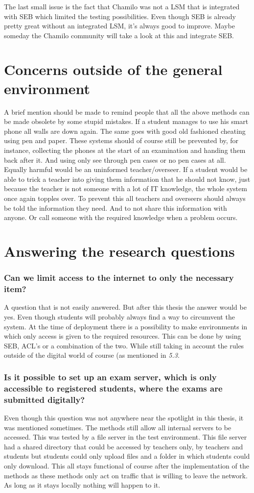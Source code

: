 The last small issue is the fact that Chamilo was not a LSM that is integrated with SEB which limited the testing possibilities. Even though SEB is already pretty great without an integrated LSM, it's always good to improve. Maybe someday the Chamilo community will take a look at this and integrate SEB.
\section{Concerns outside of the general environment}
A brief mention should be made to remind people that all the above methods can be made obsolete by some stupid mistakes. If a student manages to use his smart phone all walls are down again. The same goes with good old fashioned cheating using pen and paper. These systems should of course still be prevented by, for instance, collecting the phones at the start of an examination and handing them back after it. And using only see through pen cases or no pen cases at all.\\

 Equally harmful would be an uninformed teacher/overseer. If a student would be able to trick a teacher into giving them information that he should not know, just because the teacher is not someone with a lot of IT knowledge, the whole system once again topples over. To prevent this all teachers and overseers should always be told the information they need. And to not share this information with anyone. Or call someone with the required knowledge when a problem occurs.
\section{Answering the research questions}
\subsubsection{Can we limit access to the internet to only the necessary item?}
A question that is not easily answered. But after this thesis the answer would be yes. Even though students will probably always find a way to circumvent the system. At the time of deployment there is a possibility to make environments in which only access is given to the required resources. This can be done by using SEB, ACL's or a combination of the two. While still taking in account the rules outside of the digital world of course (as mentioned in \textit{5.3}.
\subsubsection{Is it possible to set up an exam server, which is only accessible to registered students, where the exams are submitted digitally?}
Even though this question was not anywhere near the spotlight in this thesis, it was mentioned sometimes. The methods still allow all internal servers to be accessed. This was tested by a file server in the test environment. This file server had a shared directory that could be accessed by teachers only, by teachers and students but students could only upload files and a folder in which students could only download. This all stays functional of course after the implementation of the methods as these methods only act on traffic that is willing to leave the network. As long as it stays locally nothing will happen to it.
